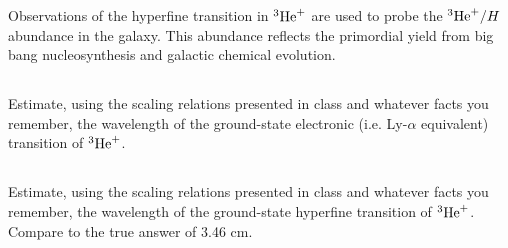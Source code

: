 \documentclass[11pt]{article}
\begin{document}
Observations of the hyperfine transition in ${^3{\rm He}^+}$ are used to probe the ${^3{\rm He}^+}/H$ abundance
in the galaxy.  This abundance reflects the primordial yield from big bang nucleosynthesis
and galactic chemical evolution.

\subsection{}
Estimate, using the scaling relations presented in class and whatever facts you
remember, the wavelength of the ground-state electronic (i.e. Ly-$\alpha$ equivalent) transition of ${^3{\rm He}^+}$.

\subsection{}
Estimate, using the scaling relations presented in class and whatever facts you
remember, the wavelength of the ground-state hyperfine transition of ${^3{\rm He}^+}$.  Compare
to the true answer of 3.46 cm.
\end{document}
